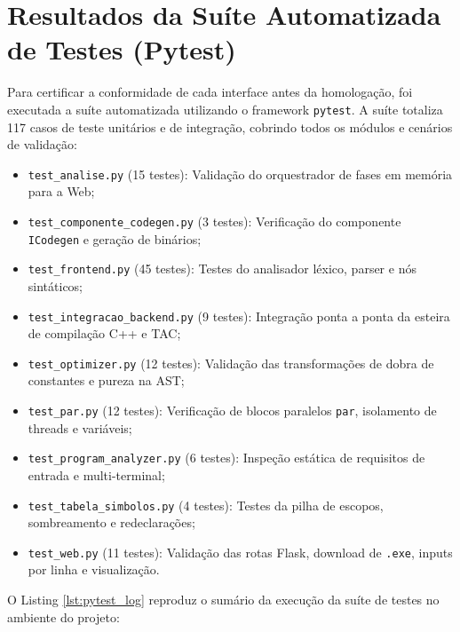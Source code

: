 \section{Resultados da Suíte Automatizada de Testes (Pytest)}

Para certificar a conformidade de cada interface antes da homologação, foi executada a suíte automatizada utilizando o framework \texttt{pytest}. A suíte totaliza 117 casos de teste unitários e de integração, cobrindo todos os módulos e cenários de validação:

\begin{itemize}
    \item \texttt{test\_analise.py} (15 testes): Validação do orquestrador de fases em memória para a Web;
    \item \texttt{test\_componente\_codegen.py} (3 testes): Verificação do componente \texttt{ICodegen} e geração de binários;
    \item \texttt{test\_frontend.py} (45 testes): Testes do analisador léxico, parser e nós sintáticos;
    \item \texttt{test\_integracao\_backend.py} (9 testes): Integração ponta a ponta da esteira de compilação C++ e TAC;
    \item \texttt{test\_optimizer.py} (12 testes): Validação das transformações de dobra de constantes e pureza na AST;
    \item \texttt{test\_par.py} (12 testes): Verificação de blocos paralelos \texttt{par}, isolamento de threads e variáveis;
    \item \texttt{test\_program\_analyzer.py} (6 testes): Inspeção estática de requisitos de entrada e multi-terminal;
    \item \texttt{test\_tabela\_simbolos.py} (4 testes): Testes da pilha de escopos, sombreamento e redeclarações;
    \item \texttt{test\_web.py} (11 testes): Validação das rotas Flask, download de \texttt{.exe}, inputs por linha e visualização.
\end{itemize}

O Listing \ref{lst:pytest_log} reproduz o sumário da execução da suíte de testes no ambiente do projeto:

